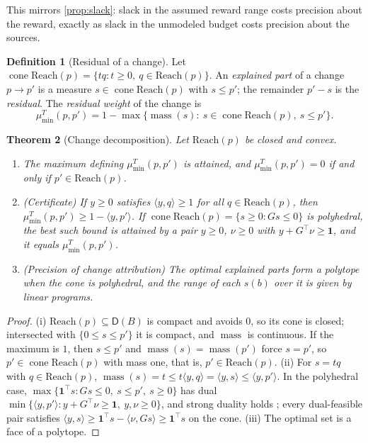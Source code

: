 \documentclass[11pt]{article}
\newtheorem{theorem}{Theorem}[section]
\theoremstyle{definition}
\newtheorem{definition}[theorem]{Definition}
\theoremstyle{remark}
\newcommand{\D}{\mathsf{D}}
\newcommand{\Reach}{\mathrm{Reach}}
\newcommand{\cone}{\operatorname{cone}}
\newcommand{\mass}{\operatorname{mass}}
\begin{document}
This mirrors \cref{prop:slack}: slack in the assumed reward range costs precision about the reward,
exactly as slack in the unmodeled budget costs precision about the sources.

\begin{definition}[Residual of a change]
Let $\cone\Reach(p)=\{tq:t\ge0,\ q\in\Reach(p)\}$. An \emph{explained part} of a change $p\to p'$ is a
measure $s\in\cone\Reach(p)$ with $s\le p'$; the remainder $p'-s$ is the \emph{residual}. The
\emph{residual weight} of the change is
\[
\mu^T_{\min}(p,p')=1-\max\{\mass(s):\ s\in\cone\Reach(p),\ s\le p'\}.
\]
\end{definition}

\begin{theorem}[Change decomposition]\label{thm:change}
Let $\Reach(p)$ be closed and convex.
\begin{enumerate}[label=(\roman*)]
\item The maximum defining $\mu^T_{\min}(p,p')$ is attained, and $\mu^T_{\min}(p,p')=0$ if and only if
  $p'\in\Reach(p)$.
\item (Certificate) If $y\ge0$ satisfies $\langle y,q\rangle\ge1$ for all $q\in\Reach(p)$, then
  $\mu^T_{\min}(p,p')\ge1-\langle y,p'\rangle$. If $\cone\Reach(p)=\{s\ge0:Gs\le0\}$ is polyhedral, the
  best such bound is attained by a pair $y\ge0$, $\nu\ge0$ with $y+G^{\top}\nu\ge\mathbf{1}$, and it equals
  $\mu^T_{\min}(p,p')$.
\item (Precision of change attribution) The optimal explained parts form a polytope when the cone is
  polyhedral, and the range of each $s(b)$ over it is given by linear programs.
\end{enumerate}
\end{theorem}
\begin{proof}
(i) $\Reach(p)\subseteq\D(B)$ is compact and avoids $0$, so its cone is closed; intersected with
$\{0\le s\le p'\}$ it is compact, and $\mass$ is continuous. If the maximum is $1$, then $s\le p'$ and
$\mass(s)=\mass(p')$ force $s=p'$, so $p'\in\cone\Reach(p)$ with mass one, that is, $p'\in\Reach(p)$.
(ii) For $s=tq$ with $q\in\Reach(p)$, $\mass(s)=t\le t\langle y,q\rangle=\langle y,s\rangle\le\langle
y,p'\rangle$. In the polyhedral case, $\max\{\mathbf 1^{\top}s: Gs\le0,\ s\le p',\ s\ge0\}$ has dual
$\min\{\langle y,p'\rangle:y+G^{\top}\nu\ge\mathbf 1,\ y,\nu\ge0\}$, and strong duality holds
\cite{Schrijver1986}; every dual-feasible pair satisfies $\langle y,s\rangle\ge\mathbf 1^{\top}s-\langle
\nu,Gs\rangle\ge\mathbf 1^{\top}s$ on the cone. (iii) The optimal set is a face of a polytope.
\end{proof}
\end{document}
